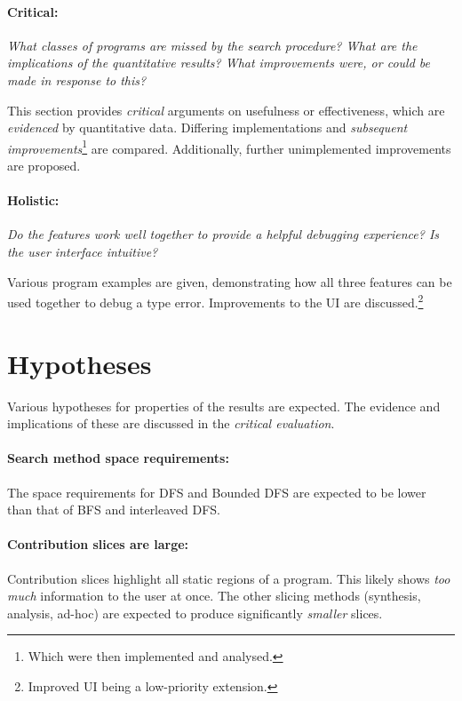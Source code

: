 \paragraph{Critical: } \textit{What \textit{classes} of programs are missed by the search procedure? What are the implications of the \textit{quantitative} results? What improvements were, or could be made in response to this?}

This section provides \textit{critical} arguments on {usefulness} or {effectiveness}, which are \textit{evidenced} by quantitative data. Differing implementations and \textit{subsequent improvements}\footnote{Which were then implemented and analysed.} are compared. Additionally, further unimplemented improvements are proposed.

\paragraph{Holistic: } \textit{Do the features work well together to provide a helpful debugging experience? Is the user interface intuitive?}

Various program examples are given, demonstrating how all three features can be used together to debug a type error. Improvements to the UI are discussed.\footnote{Improved UI being a low-priority extension.} 



\section{Hypotheses}
Various hypotheses for properties of the results are expected. The evidence and implications of these are discussed in the \textit{critical evaluation}.

\paragraph{Search method space requirements: } The space requirements for DFS and Bounded DFS are expected to be lower than that of BFS and interleaved DFS.

\paragraph{Contribution slices are large: } Contribution slices highlight all static regions of a program. This likely shows \textit{too much} information to the user at once. The other slicing methods (synthesis, analysis, ad-hoc) are expected to produce significantly \textit{smaller} slices. 

